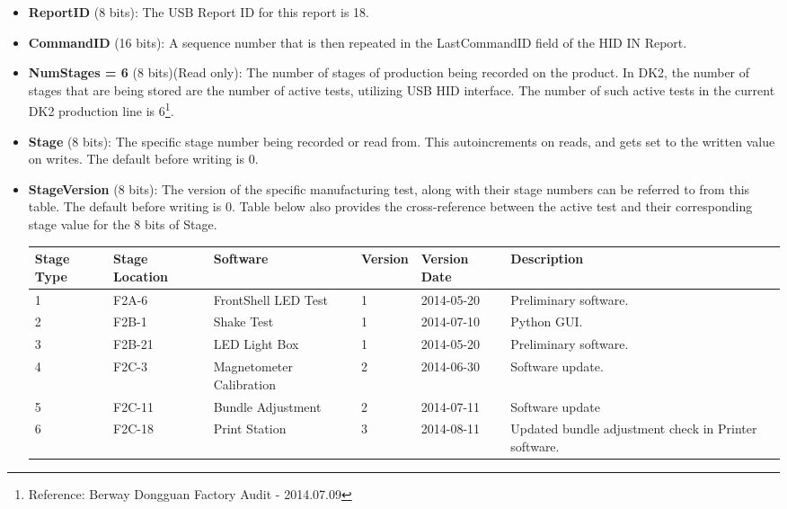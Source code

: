 \documentclass[letterpaper]{article}
\begin{document}
\begin{itemize}
    \item {\bfseries ReportID} (8 bits): The USB Report ID for this report is 18.
    \item {\bfseries CommandID} (16 bits): A sequence number that is then repeated in the LastCommandID field of the HID IN Report.
    \item {\bfseries NumStages = 6} (8 bits)(Read only): The number of stages of production being recorded on the product. In DK2, the number of stages that are being stored are the number of active tests, utilizing USB HID interface. The number of such active tests in the current DK2 production line is 6\footnote{Reference: Berway Dongguan Factory Audit - 2014.07.09}.
    
    \item {\bfseries Stage} (8 bits): The specific stage number being recorded or read from.  This autoincrements on reads, and gets set to the written value on writes. The default before writing is 0. 
    \item {\bfseries StageVersion} (8 bits): The version of the specific manufacturing test, along with their stage numbers can be referred to from this table. The default before writing is 0. Table below also provides the cross-reference between the active test and their corresponding stage value for the 8 bits of Stage.
        \begin{center}
            \begin{tabular}{ | p{0.8cm} | p{1.4cm} | p{2.1cm} | l | p{1.7cm} | p{2.2cm} |}
            \hline
            \cellcolor{lightgray} Stage Type &  \cellcolor{lightgray} Stage   Location & \cellcolor{lightgray} Software & \cellcolor{lightgray}Version & \cellcolor{lightgray} Version Date & \cellcolor{lightgray} Description \\ \hline
            1 & F2A-6 & FrontShell LED Test & 1 & 2014-05-20 & Preliminary software. \\ \hline
            2 & F2B-1 & Shake Test & 1 & 2014-07-10 & Python GUI. \\ \hline
            3 & F2B-21 & LED Light Box & 1 & 2014-05-20 & Preliminary software. \\ \hline
            4 & F2C-3 & Magnetometer Calibration & 2 & 2014-06-30 & Software update. \\ \hline
            5 & F2C-11 & Bundle Adjustment & 2 & 2014-07-11 & Software update \\ \hline
            6 & F2C-18 & Print Station & 3 & 2014-08-11 & Updated bundle adjustment check in Printer software. \\ \hline
            \end{tabular}
        \end{center}
  

\end{itemize}
\end{document}
